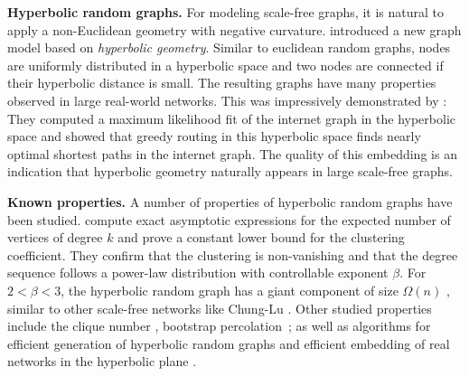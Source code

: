 \documentclass{llncs}
\begin{document}
\textbf{Hyperbolic random graphs.}
For modeling scale-free graphs, it is natural to apply a non-Euclidean geometry with negative curvature.
\citet{krioukov2010hyperbolic} introduced a new graph model based on \emph{hyperbolic geometry}. Similar to euclidean random graphs,
nodes are uniformly distributed in a hyperbolic space and two nodes are connected
if their hyperbolic distance is small. 
The resulting graphs have many properties observed in large real-world networks.
This was impressively demonstrated by \citet{boguna2010sustaining}:
They computed a maximum likelihood fit of the internet graph in the hyperbolic space
and showed that greedy routing in this hyperbolic space finds nearly optimal shortest paths in the internet graph.
The quality of this embedding is an indication that hyperbolic geometry naturally appears in large scale-free graphs.

\textbf{Known properties.}
A number of properties of hyperbolic random graphs have been studied.
\citet{gugelmann2012random} compute exact asymptotic expressions for the expected number of vertices of degree $k$ and prove a constant lower bound for the clustering coefficient.
They confirm that the clustering is non-vanishing and that the degree sequence follows a power-law distribution with controllable exponent $\beta$. For $2 < \beta < 3$, the hyperbolic random graph has a giant component of size $\Omega(n)$ \cite{Bode:2013aa,bfmconnected}, similar to other scale-free networks like Chung-Lu \cite{chung2002average}. Other studied properties include the clique number \cite{friedrich2015cliques}, bootstrap percolation~\cite{candellero2014bootstrap}; as well as algorithms for efficient generation of hyperbolic random graphs \cite{von2015fast} and efficient embedding of real networks in the hyperbolic plane \cite{6705650}.
\end{document}
